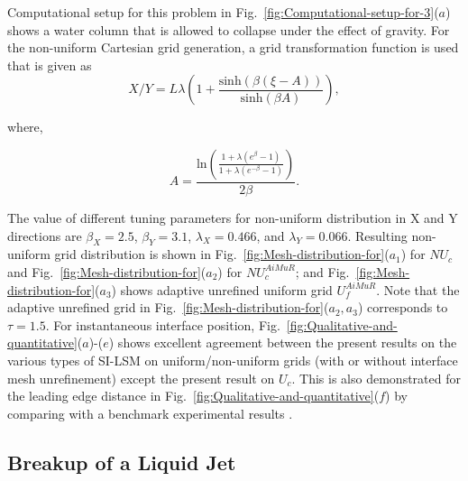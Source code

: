 \documentclass[preprint,12pt]{elsarticle}
\begin{document}
Computational setup for this problem in Fig.~\ref{fig:Computational-setup-for-3}($a$)
shows a water column that is allowed to collapse under the effect of gravity. For the non-uniform Cartesian grid generation, a grid transformation function \cite{hoffmann2000}
is used that is given as
\begin{equation}
X/Y=L\lambda\left(1+\frac{\text{sinh}\left(\beta\left(\xi-A\right)\right)}{\text{sinh}\left(\beta A\right)}\right),\label{eq:4.2-1}
\end{equation}


where,

\[
A=\frac{\text{ln}\left(\frac{1+\lambda\left(e^{\beta}-1\right)}{1+\lambda\left(e^{-\beta}-1\right)}\right)}{2\beta}.
\]


\noindent The value of different tuning parameters for non-uniform distribution
in X and Y directions are $\beta_{X}=2.5$, $\beta_{Y}=3.1$, $\lambda_{X}=0.466$, and
$\lambda_{Y}=0.066$. Resulting non-uniform grid distribution is shown
in Fig.~\ref{fig:Mesh-distribution-for}($a_{1}$) for $NU_{c}$ and Fig.~\ref{fig:Mesh-distribution-for}($a_{2}$) for $NU_{c}^{AiMuR}$; and Fig.~\ref{fig:Mesh-distribution-for}($a_{3}$) shows adaptive unrefined uniform grid $U_{f}^{AiMuR}$. Note that the adaptive unrefined grid in Fig.~\ref{fig:Mesh-distribution-for}($a_{2},a_{3}$) corresponds to $\tau=1.5$. For instantaneous interface position, Fig.~\ref{fig:Qualitative-and-quantitative}($a$)-($e$) shows excellent agreement between the present results on the various types of SI-LSM on uniform/non-uniform grids (with or without interface mesh unrefinement) except the present result on $U_{c}$. This is also demonstrated for the leading edge distance in Fig.~\ref{fig:Qualitative-and-quantitative}($f$) by comparing with a benchmark experimental results \cite{martin1952}.
\noindent


\subsection{Breakup of a Liquid Jet}\label{sub:Breakup-of-a}
\end{document}
